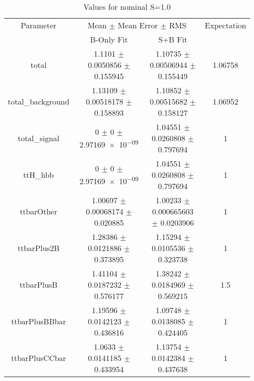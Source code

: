 \begin{table}
\centering
\caption{Values for nominal S=1.0}
\begin{tabular}{cccc}
\toprule
Parameter & \multicolumn{2}{c}{Mean $\pm$ Mean Error $\pm$ RMS} & Expectation\\
 & B-Only Fit & S+B Fit & \\
\midrule
total & \num{1.1101} $\pm$ \num{0.0050856} $\pm$ \num{0.155945} & \num{1.10735} $\pm$ \num{0.00506944} $\pm$ \num{0.155449} & \num{1.06758}\\
total\_background & \num{1.13109} $\pm$ \num{0.00518178} $\pm$ \num{0.158893} & \num{1.10852} $\pm$ \num{0.00515682} $\pm$ \num{0.158127} & \num{1.06952}\\
total\_signal & \num{0} $\pm$ \num{0} $\pm$ \num{2.97169e-09} & \num{1.04551} $\pm$ \num{0.0260808} $\pm$ \num{0.797694} & \num{1}\\
ttH\_hbb & \num{0} $\pm$ \num{0} $\pm$ \num{2.97169e-09} & \num{1.04551} $\pm$ \num{0.0260808} $\pm$ \num{0.797694} & \num{1}\\
ttbarOther & \num{1.00697} $\pm$ \num{0.00068174} $\pm$ \num{0.020885} & \num{1.00233} $\pm$ \num{0.000665603} $\pm$ \num{0.0203906} & \num{1}\\
ttbarPlus2B & \num{1.28386} $\pm$ \num{0.0121886} $\pm$ \num{0.373895} & \num{1.15294} $\pm$ \num{0.0105536} $\pm$ \num{0.323738} & \num{1}\\
ttbarPlusB & \num{1.41104} $\pm$ \num{0.0187232} $\pm$ \num{0.576177} & \num{1.38242} $\pm$ \num{0.0184969} $\pm$ \num{0.569215} & \num{1.5}\\
ttbarPlusBBbar & \num{1.19596} $\pm$ \num{0.0142123} $\pm$ \num{0.436816} & \num{1.09748} $\pm$ \num{0.0138085} $\pm$ \num{0.424405} & \num{1}\\
ttbarPlusCCbar & \num{1.0633} $\pm$ \num{0.0141185} $\pm$ \num{0.433954} & \num{1.13754} $\pm$ \num{0.0142384} $\pm$ \num{0.437638} & \num{1}\\
\bottomrule
\end{tabular}
\end{table}
